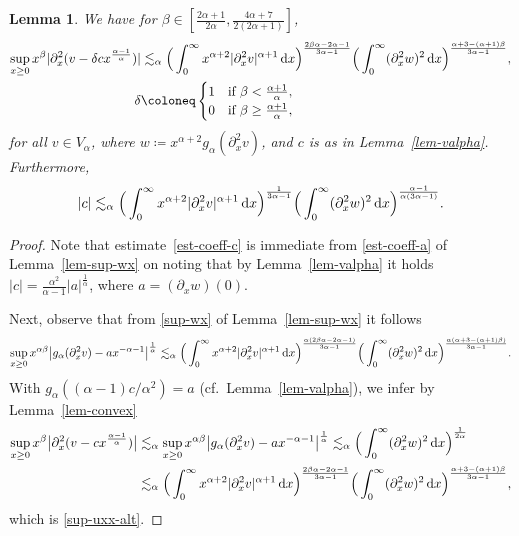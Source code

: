 \documentclass[reqno,12pt]{amsart}
\renewcommand{\d}{\ensuremath{\mathrm{d}}}
\renewcommand{\d}{\ensuremath{{\rm d}}}
\newtheorem{lemma}[theorem]{Lemma}
\numberwithin{equation}{section}
\begin{document}
%
\begin{lemma}\label{lem-sup-uxx}
We have for $\beta \in [\frac{2\alpha+1}{2\alpha},\frac{4\alpha+7}{2(2\alpha+1)}]$,
%
\begin{align}\nonumber
\sup_{x \ge 0} x^\beta |\partial_x^2 (v - \delta c x^{\frac{\alpha-1}{\alpha}})| &\lesssim_\alpha \Big(\int_0^\infty x^{\alpha+2} |\partial_x^2 v|^{\alpha+1} \, \d x\Big)^{\frac{2\beta\alpha-2\alpha-1}{3\alpha-1}} \Big(\int_0^\infty (\partial_x^2 w)^2 \, \d x\Big)^{\frac{\alpha+3 - (\alpha+1)\beta}{3\alpha-1}},  \\
\delta &\coloneq \begin{cases} 1 & \text{if } \beta < \frac{\alpha+1}{\alpha}, \\ 0 & \text{if } \beta \ge \frac{\alpha+1}{\alpha}, \end{cases} \label{sup-uxx-alt}
\end{align}
%
for all $v \in V_\alpha$, where $w \coloneq x^{\alpha+2} g_\alpha(\partial_x^2 v)$, and $c$ is as in Lemma~\ref{lem-valpha}. Furthermore,
%
\begin{equation}\label{est-coeff-c}
|c| \lesssim_\alpha \Big(\int_0^\infty x^{\alpha+2} |\partial_x^2 v|^{\alpha+1} \, \d x\Big)^{\frac{1}{3\alpha-1}} \Big(\int_0^\infty (\partial_x^2 w)^2 \, \d x\Big)^{\frac{\alpha-1}{\alpha(3\alpha-1)}}.
\end{equation}
%
\end{lemma}
%

%
\begin{proof}
Note that estimate~\eqref{est-coeff-c} is immediate from \eqref{est-coeff-a} of Lemma~\ref{lem-sup-wx} on noting that by Lemma~\ref{lem-valpha} it holds $|c| = \frac{\alpha^2}{\alpha-1} |a|^{\frac 1 \alpha}$, where $a = (\partial_x w)(0)$.

%
\bigskip
%

Next, observe that from \eqref{sup-wx} of Lemma~\ref{lem-sup-wx} it follows
%
\[
\sup_{x \ge 0} x^{\alpha\beta} \big| g_\alpha(\partial_x^2 v) - a x^{-\alpha-1}\big|^{\frac{1}{\alpha}} \lesssim_\alpha \Big(\int_0^\infty x^{\alpha+2} |\partial_x^2 v|^{\alpha+1} \, \d x\Big)^{\frac{\alpha (2\beta\alpha-2\alpha-1)}{3\alpha-1}} \Big(\int_0^\infty (\partial_x^2 w)^2 \, \d x\Big)^{\frac{\alpha (\alpha+3 - (\alpha+1)\beta)}{3\alpha-1}}.
\]
%
With $g_\alpha((\alpha-1) c / \alpha^2) = a$ (cf.~Lemma~\ref{lem-valpha}), we infer by Lemma~\ref{lem-convex}
%
\begin{align*}
\sup_{x \ge 0} x^\beta \big|\partial_x^2 (v-c x^{\frac{\alpha-1}{\alpha}})\big| &\lesssim_\alpha \sup_{x \ge 0} x^{\alpha\beta} \big| g_\alpha(\partial_x^2 v) - a x^{-\alpha-1}\big|^{\frac{1}{\alpha}} \lesssim_\alpha \Big(\int_0^\infty (\partial_x^2 w)^2 \, \d x\Big)^{\frac{1}{2\alpha}} \\
&\lesssim_\alpha \Big(\int_0^\infty x^{\alpha+2} |\partial_x^2 v|^{\alpha+1} \, \d x\Big)^{\frac{2\beta\alpha-2\alpha-1}{3\alpha-1}} \Big(\int_0^\infty (\partial_x^2 w)^2 \, \d x\Big)^{\frac{\alpha+3 - (\alpha+1)\beta}{3\alpha-1}},
\end{align*}
%
which is \eqref{sup-uxx-alt}.
\end{proof}
%
\end{document}
